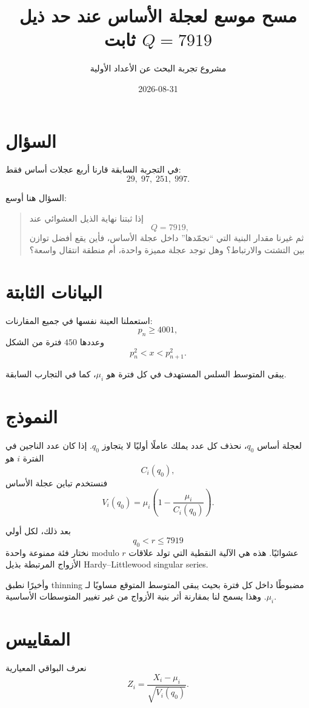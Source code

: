 \documentclass[12pt]{article}
\title{مسح موسع لعجلة الأساس عند حد ذيل ثابت \(Q=7919\)}
\author{مشروع تجربة البحث عن الأعداد الأولية}
\date{2026-08-31}
\begin{document}
\maketitle

\section{السؤال}

في التجربة السابقة قارنا أربع عجلات أساس فقط:
\[
29,\;97,\;251,\;997.
\]

السؤال هنا أوسع:

\begin{quote}
إذا ثبتنا نهاية الذيل العشوائي عند
\[
Q=7919,
\]
ثم غيرنا مقدار البنية التي ``نجمّدها'' داخل عجلة الأساس، فأين يقع أفضل توازن بين التشتت والارتباط؟
وهل توجد عجلة مميزة واحدة، أم منطقة انتقال واسعة؟
\end{quote}

\section{البيانات الثابتة}

استعملنا العينة نفسها في جميع المقارنات:
\[
p_n\ge 4001,
\]
وعددها \(450\) فترة من الشكل
\[
p_n^2<x<p_{n+1}^2.
\]

يبقى المتوسط السلس المستهدف في كل فترة هو \(\mu_i\)، كما في التجارب السابقة.

\section{النموذج}

لعجلة أساس \(q_0\)، نحذف كل عدد يملك عاملًا أوليًا لا يتجاوز \(q_0\).
إذا كان عدد الناجين في الفترة \(i\) هو
\[
C_i(q_0),
\]
فنستخدم تباين عجلة الأساس
\[
V_i(q_0)
=
\mu_i\left(1-\frac{\mu_i}{C_i(q_0)}\right).
\]

بعد ذلك، لكل أولي
\[
q_0<r\le7919
\]
نختار فئة ممنوعة واحدة modulo \(r\) عشوائيًا.
هذه هي الآلية النقطية التي تولد علاقات الأزواج المرتبطة بذيل
Hardy--Littlewood singular series.

وأخيرًا نطبق thinning مضبوطًا داخل كل فترة بحيث يبقى المتوسط المتوقع مساويًا لـ\(\mu_i\).
وهذا يسمح لنا بمقارنة أثر بنية الأزواج من غير تغيير المتوسطات الأساسية.

\section{المقاييس}

نعرف البواقي المعيارية
\[
Z_i
=
\frac{X_i-\mu_i}{\sqrt{V_i(q_0)}}.
\]
\end{document}
